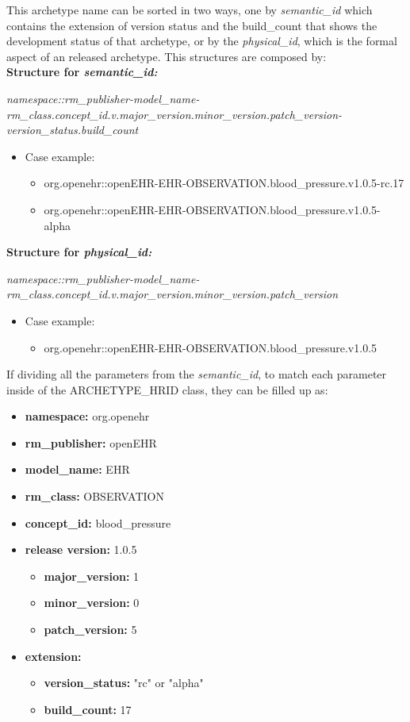 \documentclass[mim_thesis.tex]{subfiles}
\begin{document}
This archetype name can be sorted in two ways, one by \textit{semantic\_id} which contains the extension of version status and the build\_count that shows the development status of that archetype, or by the \textit{physical\_id}, which is the formal aspect of an released archetype. This structures are composed by: \\

\textbf{Structure for \textit{semantic\_id:}} 

\textit{namespace::rm\_publisher-model\_name-
rm\_class.concept\_id.v.major\_version.minor\_version.patch\_version-
version\_status.build\_count}
\begin{itemize}[noitemsep]
\item Case example:
\begin{itemize}[noitemsep]
\item org.openehr::openEHR-EHR-OBSERVATION.blood\_pressure.v1.0.5-rc.17 
\item org.openehr::openEHR-EHR-OBSERVATION.blood\_pressure.v1.0.5-alpha \\ 
\end{itemize}
\end{itemize}

\textbf{Structure for \textit{physical\_id:}} 

\textit{namespace::rm\_publisher-model\_name-
rm\_class.concept\_id.v.major\_version.minor\_version.patch\_version}
\begin{itemize}[noitemsep]
\item Case example:
\begin{itemize}[noitemsep]
\item org.openehr::openEHR-EHR-OBSERVATION.blood\_pressure.v1.0.5
\end{itemize}
\end{itemize}

If dividing all the parameters from the \textit{semantic\_id}, to match each parameter inside of the ARCHETYPE\_HRID class, they can be filled up as: 
\begin{itemize}[noitemsep]
\item \textbf{namespace:} org.openehr
\item \textbf{rm\_publisher:} openEHR
\item \textbf{model\_name:} EHR
\item \textbf{rm\_class:} OBSERVATION
\item \textbf{concept\_id:} blood\_pressure
\item \textbf{release version:} 1.0.5
\begin{itemize}
\item \textbf{major\_version:} 1
\item \textbf{minor\_version:} 0
\item \textbf{patch\_version:} 5
\end{itemize}
\item \textbf{extension:}
\begin{itemize}
\item \textbf{version\_status:} "rc" or "alpha"
\item \textbf{build\_count:} 17
\end{itemize}
\end{itemize}
\end{document}
